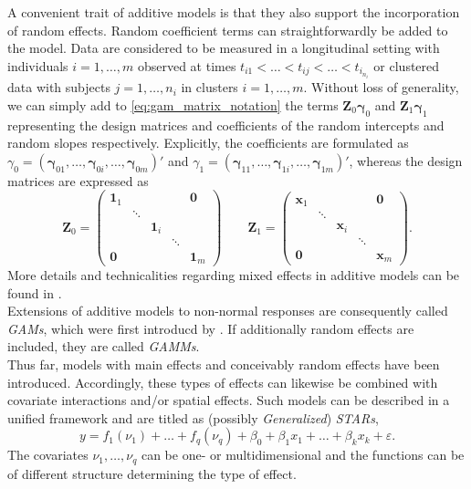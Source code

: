 A convenient trait of additive models is that they also support the incorporation of random effects. Random coefficient terms can straightforwardly be added to the model.
Data are considered to be measured in a longitudinal setting with individuals  $i=1, \ldots, m$ observed at times $t_{i1} < \ldots < t_{ij} < \ldots < t_{i_{n_i}}$ or clustered data with subjects $j=1, \ldots, n_i$ in clusters $i=1, \ldots, m$. Without loss of generality, we can simply add to \autoref{eq:gam_matrix_notation} the terms $\bm{Z}_0 \bm{\gamma}_0$ and $\bm{Z}_1 \bm{\gamma}_1$ representing the design matrices and coefficients of the random intercepts and random slopes respectively. Explicitly, the coefficients are formulated as $\gamma_{0}=\left(\bm{\gamma}_{01}, \ldots, \bm{\gamma}_{0 i}, \ldots, \bm{\gamma}_{0 m}\right)'$ and $\gamma_{1}=\left(\bm{\gamma}_{11}, \ldots, \bm{\gamma}_{1 i}, \ldots, \bm{\gamma}_{1 m}\right)'$, whereas the design matrices are expressed as
\begin{equation}
\bm{Z}_0 =
\left(
\begin{matrix}
\bm{1}_1 &  &  &  & \bm{0} \\ 
 & \ddots &  &  &  \\ 
 &  & \bm{1}_i &  &  \\ 
 &  &  & \ddots &  \\ 
\bm{0} &  &  &  & \bm{1}_m
\end{matrix} 
\right)
\qquad
\bm{Z}_1 =
\left(
\begin{matrix}
\bm{x}_1 &  &  &  & \bm{0} \\ 
 & \ddots &  &  &  \\ 
 &  & \bm{x}_i &  &  \\ 
 &  &  & \ddots &  \\ 
\bm{0} &  &  &  & \bm{x}_m
\end{matrix} 
\right).
\end{equation}
More details and technicalities regarding mixed effects in additive models can be found in \cite{fahrmeir2003regression}.\\


Extensions of additive models to non-normal responses are consequently called \textit{\acp{GAM}}, which were first introducd by \cite{hastie1986}. If additionally random effects are included, they are called \textit{\acp{GAMM}}.\\
Thus far, models with main effects and conceivably random effects have been introduced. Accordingly, these types of effects can likewise be combined with covariate interactions and/or spatial effects. Such models can be described in a unified framework and are titled as (possibly \textit{Generalized}) \textit{\acp{STAR}},
\begin{equation}
y=f_{1}\left(\nu_{1}\right)+\ldots+f_{q}\left(\nu_{q}\right)+\beta_{0}+\beta_{1} x_{1}+\ldots+\beta_{k} x_{k}+\varepsilon.
\end{equation}
The covariates $\nu_1, \ldots, \nu_q$ can be one- or multidimensional and the functions can be of different structure determining the type of effect.




